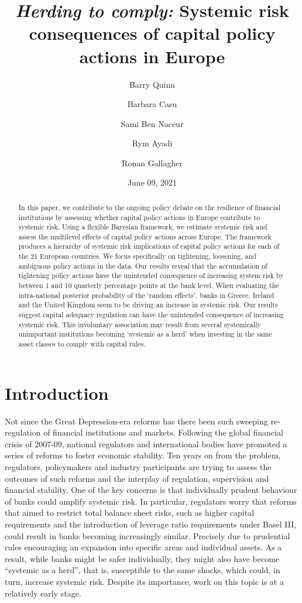 \documentclass[
  10pt,
]{article}
\title{\emph{Herding to comply:} Systemic risk consequences of capital policy
actions in Europe}
\author{Barry Quinn \and Barbara Casu \and Sami Ben Naceur \and Rym Ayadi \and Ronan Gallagher}
\date{June 09, 2021}
\begin{document}
\maketitle
\begin{abstract}
In this paper, we contribute to the ongoing policy debate on the
resilience of financial institutions by assessing whether capital policy
actions in Europe contribute to systemic risk. Using a flexible Bayesian
framework, we estimate systemic risk and assess the multilevel effects
of capital policy actions across Europe. The framework produces a
hierarchy of systemic risk implications of capital policy actions for
each of the 21 European countries. We focus specifically on tightening,
loosening, and ambiguous policy actions in the data. Our results reveal
that the accumulation of tightening policy actions have the unintended
consequence of increasing system risk by between 1 and 10 quarterly
percentage points at the bank level. When evaluating the intra-national
posterior probability of the `random effects', banks in Greece, Ireland
and the United Kingdom seem to be driving an increase in systemic risk.
Our results suggest capital adequacy regulation can have the unintended
consequence of increasing systemic risk. This involuntary association
may result from several systemically unimportant institutions becoming
`systemic as a herd' when investing in the same asset classes to comply
with capital rules.
\end{abstract}

\hypertarget{introduction}{%
\section{Introduction}\label{introduction}}

Not since the Great Depression-era reforms has there been such sweeping
re-regulation of financial institutions and markets. Following the
global financial crisis of 2007-09, national regulators and
international bodies have promoted a series of reforms to foster
economic stability. Ten years on from the problem, regulators,
policymakers and industry participants are trying to assess the outcomes
of such reforms and the interplay of regulation, supervision and
financial stability. One of the key concerns is that individually
prudent behaviour of banks could amplify systemic risk. In particular,
regulators worry that reforms that aimed to restrict total balance sheet
risks, such as higher capital requirements and the introduction of
leverage ratio requirements under Basel III, could result in banks
becoming increasingly similar. Precisely due to prudential rules
encouraging an expansion into specific areas and individual assets. As a
result, while banks might be safer individually, they might also have
become ``systemic as a herd'', that is, susceptible to the same shocks,
which could, in turn, increase systemic risk. Despite its importance,
work on this topic is at a relatively early stage.
\end{document}
